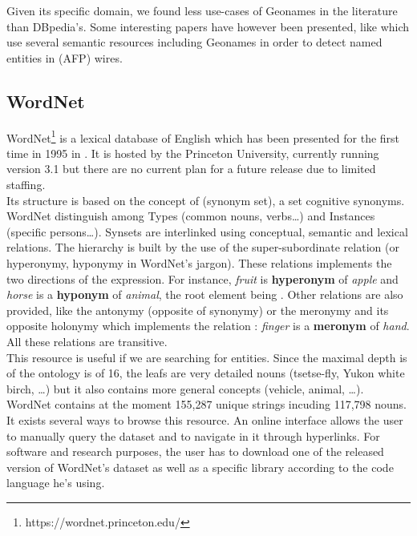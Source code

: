 Given its specific domain, we found less use-cases of Geonames in the literature than DBpedia's. Some interesting papers have however been presented, like \cite{stern2010detection} which use several semantic resources including Geonames in order to detect named entities in  (AFP) wires.

\subsection{WordNet} %
\label{sub:wordnet}

WordNet\footnote{https://wordnet.princeton.edu/} is a lexical database of English which has been presented for the first time in 1995 in \cite{miller1995wordnet}. It is hosted by the Princeton University, currently running version 3.1 but there are no current plan for a future release due to limited staffing.\\

Its structure is based on the concept of  (synonym set), a set cognitive synonyms. WordNet distinguish among Types (common nouns, verbs\dots) and Instances (specific persons\dots). Synsets are interlinked using conceptual, semantic and lexical relations. The hierarchy is built by the use of the super-subordinate relation (or hyperonymy, hyponymy in WordNet's jargon). These relations implements the two directions of the  expression. For instance, \textit{fruit} is \textbf{hyperonym} of \textit{apple} and \textit{horse} is a \textbf{hyponym} of \textit{animal}, the root element being . Other relations are also provided, like the antonymy (opposite of synonymy) or the meronymy and its opposite holonymy which implements the  relation : \textit{finger} is a \textbf{meronym} of \textit{hand}. All these relations are transitive.\\

This resource is useful if we are searching for entities. Since the maximal depth is of the ontology is of 16, the leafs are very detailed nouns (tsetse-fly, Yukon white birch, \dots) but it also contains more general concepts (vehicle, animal, \dots). WordNet contains at the moment 155,287 unique strings incuding 117,798 nouns.\\ 

It exists several ways to browse this resource. An online interface allows the user to manually query the dataset and to navigate in it through hyperlinks. For software and research purposes, the user has to download one of the released version of WordNet's dataset as well as a specific library according to the code language he's using.\\

